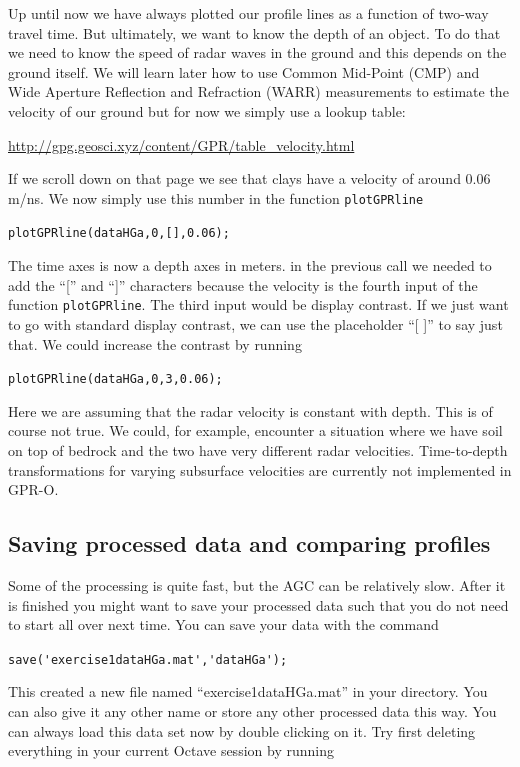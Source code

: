 \documentclass[11pt]{article}
\begin{document}
Up until now we have always plotted our profile lines as a function of
two-way travel time. But ultimately, we want to know the depth of an
object. To do that we need to know the speed of radar waves in the
ground and this depends on the ground itself. We will learn later how
to use Common Mid-Point (CMP) and Wide Aperture Reflection and
Refraction (WARR) measurements to estimate the velocity of our ground
but for now we simply use a lookup table:
  
\url{http://gpg.geosci.xyz/content/GPR/table_velocity.html}
  
If we scroll down on that page we see that clays have a velocity of
around 0.06 m/ns. We now simply use this number in the function
\verb#plotGPRline#
  
\qquad \verb#plotGPRline(dataHGa,0,[],0.06);#
  
The time axes is now a depth axes in meters. in the previous call we
needed to add the ``['' and ``]'' characters because the velocity is
the fourth input of the function \verb#plotGPRline#. The third input
would be display contrast. If we just want to go with standard display
contrast, we can use the placeholder ``[ ]'' to say just that. We
could increase the contrast by running
  
\qquad \verb#plotGPRline(dataHGa,0,3,0.06);#

Here we are assuming that the radar velocity is constant with
depth. This is of course not true. We could, for example, encounter a
situation where we have soil on top of bedrock and the two have very
different radar velocities. Time-to-depth transformations for varying
subsurface velocities are currently not implemented in GPR-O.

\subsection{Saving processed data and comparing profiles}

Some of the processing is quite fast, but the AGC can be relatively
slow. After it is finished you might want to
save your processed data such that you do not need to start all over
next time. You can save your data with the command
 
\qquad \verb#save('exercise1dataHGa.mat','dataHGa');#
 
This created a new file named ``exercise1dataHGa.mat'' in your
directory. You can also give it any other name or store any other
processed data this way. You can always load this data set now by
double clicking on it. Try first deleting everything in your current
Octave session by running
 
\end{document}
